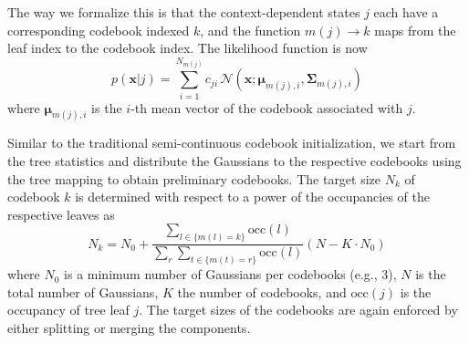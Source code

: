 \documentclass{article}
\def \x{{\mathbf x}}
\def \m{{\bm \mu}}
\def \k{{\mathbf \Sigma}}
\def \nv{{\mathcal N}}
\begin{document}
The way we formalize this is that the context-dependent states $j$ each have 
a corresponding codebook indexed $k$, and the function $m(j) \rightarrow k$ 
maps from the leaf index to the codebook index. The likelihood function is now
%
\begin{equation}
p(\x | j) = \sum_{i=1}^{N_{m(j)}} c_{ji} \, \nv\left(\x; \m_{m(j), i}, \k_{m(j), i}\right)
\end{equation}
%
where $\m_{m(j), i}$ is the $i$-th mean vector of the codebook
associated with $j$.

Similar to the traditional semi-continuous codebook initialization, we start
from the tree statistics and distribute the Gaussians to the respective codebooks
using the tree mapping to obtain preliminary codebooks.
The target size $N_k$ of codebook $k$ is determined with respect to a power
of the occupancies of the respective leaves as
\begin{equation}
N_k = N_0 + \frac
  { \sum_{l \in \{m(l) = k\}} \text{occ}(l) }
  { \sum_r \sum_{t \in \{m(t) = r\}} \text{occ}(l) } 
  \left( N - K \cdot N_0 \right)
\end{equation}
where $N_0$ is a minimum number of Gaussians per codebooks (e.g., 3), $N$ is
the total number of Gaussians, $K$ the number of codebooks, and $\text{occ}(j)$ 
is the occupancy of tree leaf $j$. 
%
%
The target sizes of the codebooks are again enforced by either splitting or
merging the components.
\end{document}
